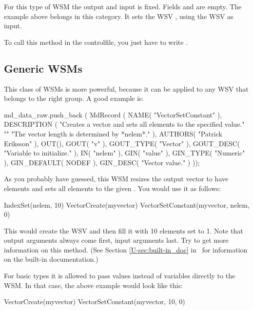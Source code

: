 For this type of WSM the output and input is fixed. Fields
 and  are empty. The example
above belongs in this category. It sets the WSV , using
the WSV  as input.

To call this method in the controlfile, you just have to write
.

\subsection{Generic WSMs}

This class of WSMs is more powerful, because it can be applied to any
WSV that belongs to the right group. A good example is:

\begin{code}
md_data_raw.push_back
  ( MdRecord
    ( NAME( "VectorSetConstant" ),
      DESCRIPTION
      (
       "Creates a vector and sets all elements to the specified value.\n"
       "\n"
       "The vector length is determined by *nelem*.\n"
       ),
      AUTHORS( "Patrick Eriksson" ),
      OUT(),
      GOUT(      "v"      ),
      GOUT_TYPE( "Vector" ),
      GOUT_DESC( "Variable to initialize." ),
      IN( "nelem" ),
      GIN(         "value"   ),
      GIN_TYPE(    "Numeric" ),
      GIN_DEFAULT( NODEF     ),
      GIN_DESC(    "Vector value." )
      ));
\end{code}

\noindent
As you probably have guessed, this WSM resizes the output vector to have  elements and sets all elements to the given .
You would use it as follows:

\begin{code}
IndexSet(nelem, 10)
VectorCreate(myvector)
VectorSetConstant(myvector, nelem, 0)
\end{code}

\noindent
This would create the WSV  and then fill it with
10 elements set to 1. Note that output arguments always come first,
input arguments last. Try  to get
more information on this method. (See Section
\ref{U-sec:built-in_doc} in \user\ for information on the built-in
documentation.)

\noindent
For basic types it is allowed to pass values instead of variables directly to
the WSM. In that case, the above example would look like this:

\begin{code}
VectorCreate(myvector)
VectorSetConstant(myvector, 10, 0)
\end{code}

